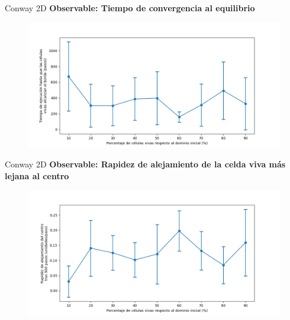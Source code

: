 \begin{frame}{Conway 2D}
    \textbf{Observable: Tiempo de convergencia al equilibrio}
    \begin{figure}[H]
        \centering
        \includegraphics[width=0.8\linewidth]{pic/conway2d/time_vs_input}
        \label{fig:conway2d:time:density}
    \end{figure}
\end{frame}

\begin{frame}{Conway 2D}
    \textbf{Observable: Rapidez de alejamiento de la celda viva más lejana al centro}
    \begin{figure}[H]
        \centering
        \includegraphics[width=0.8\linewidth]{pic/conway2d/distance_slope_vs_input}
        \label{fig:conway2d:distance_slope:density}
    \end{figure}
\end{frame}



